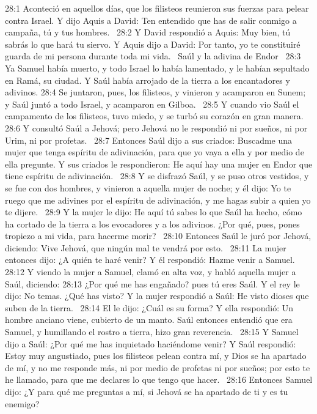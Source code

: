 28:1 Aconteció en aquellos días, que los filisteos reunieron sus fuerzas para pelear contra Israel. Y dijo Aquis a David: Ten entendido que has de salir conmigo a campaña, tú y tus hombres.  
28:2 Y David respondió a Aquis: Muy bien, tú sabrás lo que hará tu siervo. Y Aquis dijo a David: Por tanto, yo te constituiré guarda de mi persona durante toda mi vida.  
Saúl y la adivina de Endor  
28:3 Ya Samuel había muerto, y todo Israel lo había lamentado, y le habían sepultado en Ramá, su ciudad. Y Saúl había arrojado de la tierra a los encantadores y adivinos. 
28:4 Se juntaron, pues, los filisteos, y vinieron y acamparon en Sunem; y Saúl juntó a todo Israel, y acamparon en Gilboa.  
28:5 Y cuando vio Saúl el campamento de los filisteos, tuvo miedo, y se turbó su corazón en gran manera.  
28:6 Y consultó Saúl a Jehová; pero Jehová no le respondió ni por sueños, ni por Urim, ni por profetas.  
28:7 Entonces Saúl dijo a sus criados: Buscadme una mujer que tenga espíritu de adivinación, para que yo vaya a ella y por medio de ella pregunte. Y sus criados le respondieron: He aquí hay una mujer en Endor que tiene espíritu de adivinación.  
28:8 Y se disfrazó Saúl, y se puso otros vestidos, y se fue con dos hombres, y vinieron a aquella mujer de noche; y él dijo: Yo te ruego que me adivines por el espíritu de adivinación, y me hagas subir a quien yo te dijere.  
28:9 Y la mujer le dijo: He aquí tú sabes lo que Saúl ha hecho, cómo ha cortado de la tierra a los evocadores y a los adivinos. ¿Por qué, pues, pones tropiezo a mi vida, para hacerme morir?  
28:10 Entonces Saúl le juró por Jehová, diciendo: Vive Jehová, que ningún mal te vendrá por esto.  
28:11 La mujer entonces dijo: ¿A quién te haré venir? Y él respondió: Hazme venir a Samuel.  
28:12 Y viendo la mujer a Samuel, clamó en alta voz, y habló aquella mujer a Saúl, diciendo: 
28:13 ¿Por qué me has engañado? pues tú eres Saúl. Y el rey le dijo: No temas. ¿Qué has visto? Y la mujer respondió a Saúl: He visto dioses que suben de la tierra.  
28:14 El le dijo: ¿Cuál es su forma? Y ella respondió: Un hombre anciano viene, cubierto de un manto. Saúl entonces entendió que era Samuel, y humillando el rostro a tierra, hizo gran reverencia.  
28:15 Y Samuel dijo a Saúl: ¿Por qué me has inquietado haciéndome venir? Y Saúl respondió: Estoy muy angustiado, pues los filisteos pelean contra mí, y Dios se ha apartado de mí, y no me responde más, ni por medio de profetas ni por sueños; por esto te he llamado, para que me declares lo que tengo que hacer.  
28:16 Entonces Samuel dijo: ¿Y para qué me preguntas a mí, si Jehová se ha apartado de ti y es tu enemigo?  
